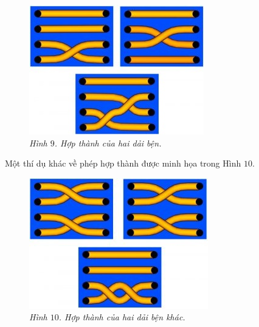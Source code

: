 \begin{multicols}{2}
	\begin{figure}[H]
		\vspace*{-5pt}
		\centering
		\captionsetup{labelformat= empty, justification=centering}
		\includegraphics[width= 0.97\linewidth]{fig_09}
		\caption{\small\textit{\color{duongvaotoanhoc}Hình $9$. Hợp thành của hai dải bện.}}
		\vspace*{-5pt}
	\end{figure}
	Một thí dụ khác về phép hợp thành được minh họa trong Hình $10$.
	\begin{figure}[H]
		\vspace*{-5pt}
		\centering
		\captionsetup{labelformat= empty, justification=centering}
		\includegraphics[width= 0.97\linewidth]{fig_10}
		\caption{\small\textit{\color{duongvaotoanhoc}Hình $10$. Hợp thành của hai dải bện khác.}}

\end{figure}
\end{multicols}
